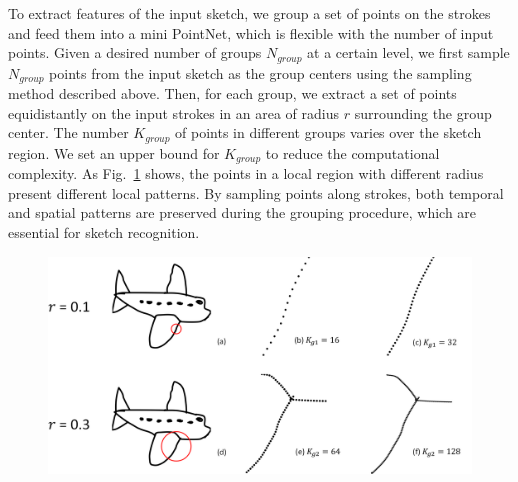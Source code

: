 To extract features of the input sketch, we group a set of points on the strokes and feed them into a mini PointNet, which is flexible with the number of input points.
%
Given a desired number of groups $N_{group}$ at a certain level, we first sample $N_{group}$ points from the input sketch as the group centers using the sampling method described above.
%
Then, for each group, we extract a set of points equidistantly on the input strokes in an area of radius $r$ surrounding the group center.
%
The number $K_{group}$ of points in different groups varies over the sketch region. We set an upper bound for $K_{group}$ to reduce the computational complexity.
%
As Fig.~\ref{fig:group} shows, the points in a local region with different radius present different local patterns.
%
By sampling points along strokes, both temporal and spatial patterns are preserved during the grouping procedure, which are essential for sketch recognition.


\begin{figure}
	\centering
	\includegraphics[width=\columnwidth]{images/group.png}
	\label{fig:group}
\end{figure}

